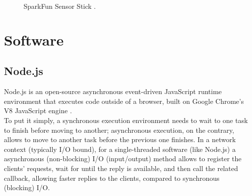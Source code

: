 \begin{center}
	\begin{figure}[ht]
		\caption{SparkFun Sensor Stick \cite{IMU}.}
	\end{figure}
\end{center}

\section{Software}

\subsection{Node.js}
Node.js is an open-source asynchronous event-driven JavaScript runtime environment that executes code outside of a browser, built on Google Chrome's V8 JavaScript engine \cite{Node.js}.\\
To put it simply, a synchronous execution environment needs to wait to one task to finish before moving to another; asynchronous execution, on the contrary, allows to move to another task before the previous one finishes. In a network context (typically I/O bound), for a single-threaded software (like Node.js) a asynchronous (non-blocking) I/O (input/output) method allows to register the clients' requests, wait for until the reply is available, and then call the related callback, allowing faster replies to the clients, compared to synchronous (blocking) I/O.

